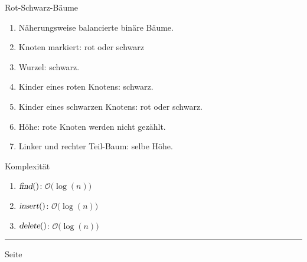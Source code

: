 \documentclass{slides}
\newcommand{\Oh}{\mathcal{O}}
\newcounter{mypage}
\begin{document}
\begin{slide}{}
\normalsize

\begin{center}
Rot-Schwarz-B\"aume
\end{center}
\vspace*{0.5cm}

\footnotesize
\begin{enumerate}
\item N\"aherungsweise balancierte bin\"are B\"aume.
\item Knoten markiert: rot oder schwarz
\item Wurzel: schwarz.
\item Kinder eines roten Knotens: schwarz. 
\item Kinder eines schwarzen Knotens: rot oder schwarz.  
\item H\"ohe:  rote Knoten werden nicht gez\"ahlt.
\item Linker und rechter Teil-Baum: selbe H\"ohe.
\end{enumerate}

Komplexit\"at
\begin{enumerate}
\item $\textsl{find}()$:   \quad $\Oh\bigl(\log(n)\bigr)$
\item $\textsl{insert}()$: \quad $\Oh\bigl(\log(n)\bigr)$
\item $\textsl{delete}()$: \quad $\Oh\bigl(\log(n)\bigr)$
\end{enumerate}


\vspace*{\fill}
\tiny \addtocounter{mypage}{1}
\rule{17cm}{1mm}
 \hspace*{\fill} Seite 
\end{slide}


\end{document}

